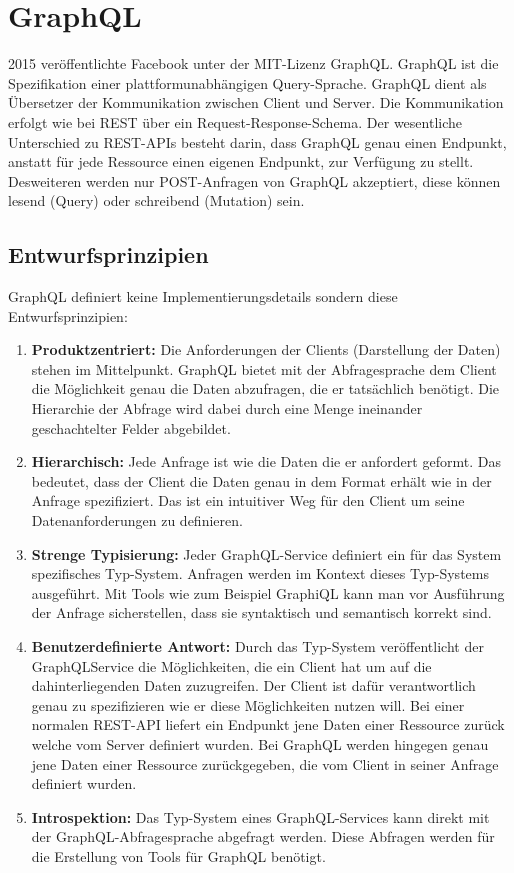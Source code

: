 \documentclass[bachelor, german ]{hgbthesis}
\begin{document}
\section{GraphQL}
2015 veröffentlichte Facebook unter der MIT-Lizenz GraphQL. GraphQL ist die Spezifikation einer plattformunabhängigen Query-Sprache. GraphQL dient als Übersetzer der Kommunikation zwischen Client und Server.
Die Kommunikation erfolgt wie bei REST über ein Request-Response-Schema.
Der wesentliche Unterschied zu REST-APIs besteht darin, dass GraphQL genau einen Endpunkt, anstatt für jede Ressource einen eigenen Endpunkt, zur Verfügung zu stellt.
Desweiteren werden nur POST-Anfragen von GraphQL akzeptiert, diese können lesend (Query) oder schreibend (Mutation) sein.

\subsection{Entwurfsprinzipien}
GraphQL definiert keine Implementierungsdetails sondern diese Entwurfsprinzipien:
\begin{enumerate}
    \item \textbf{Produktzentriert:}
    Die Anforderungen der Clients (Darstellung der Daten) stehen im Mittelpunkt. GraphQL bietet mit der Abfragesprache dem Client die Möglichkeit genau die Daten abzufragen, die er tatsächlich benötigt. Die Hierarchie der
    Abfrage wird dabei durch eine Menge ineinander geschachtelter Felder abgebildet.
    \item \textbf{Hierarchisch:}
    Jede Anfrage ist wie die Daten die er anfordert geformt.
    Das bedeutet, dass der Client die Daten genau in dem Format erhält wie in der Anfrage spezifiziert. Das ist ein intuitiver Weg für den Client um seine Datenanforderungen zu definieren.
    \item \textbf{Strenge Typisierung:}
    Jeder GraphQL-Service definiert ein für das System spezifisches Typ-System. Anfragen werden im Kontext dieses Typ-Systems ausgeführt.
    Mit Tools wie zum Beispiel GraphiQL kann man vor Ausführung der Anfrage sicherstellen, dass sie syntaktisch und semantisch korrekt sind.
    \item \textbf{Benutzerdefinierte Antwort:}
    Durch das Typ-System veröffentlicht der GraphQLService die Möglichkeiten, die ein Client hat um auf die dahinterliegenden Daten zuzugreifen.
    Der Client ist dafür verantwortlich genau zu spezifizieren wie er diese Möglichkeiten nutzen will.
    Bei einer normalen REST-API liefert ein Endpunkt jene Daten einer Ressource zurück welche vom Server definiert wurden.
    Bei GraphQL werden hingegen genau jene Daten einer Ressource zurückgegeben, die vom Client in seiner Anfrage definiert wurden.
    \item \textbf{Introspektion:}
    Das Typ-System eines GraphQL-Services kann direkt mit der GraphQL-Abfragesprache abgefragt werden. Diese Abfragen werden für die Erstellung von Tools für GraphQL benötigt.
\end{enumerate}
\end{document}
